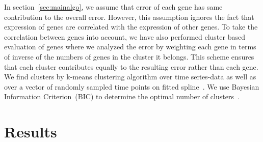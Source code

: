 \documentclass[10pt]{article}
\begin{document}
In section~\ref{sec:mainalgo}, we assume that error of each
gene has same contribution to the overall error. However, this assumption ignores the
fact that expression of genes are correlated with the expression of other genes. To take the
correlation between genes into account, we have also performed cluster
based evaluation of genes where we analyzed the error by weighting each gene in terms of inverse of the numbers of
genes in the cluster it belongs. This scheme ensures that each cluster
contributes equally to the resulting error rather than each gene. We find clusters by k-means
clustering algorithm over time series-data as well as over a vector of
randomly sampled time points on fitted spline~\cite{bishop2006}. We use Bayesian Information Criterion~(BIC) to
determine the optimal number of clusters~\cite{bic}.

\section{Results}




\end{document}
